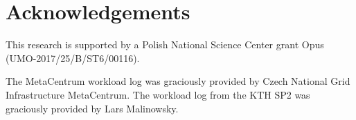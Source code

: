 \documentclass[runningheads]{llncs}
\begin{document}
\section*{Acknowledgements}
This research is supported by a Polish National Science Center grant Opus (UMO-2017/25/B/ST6/00116).

The MetaCentrum workload log \cite{10.1007/978-3-319-61756-5_5} was graciously provided by Czech National Grid Infrastructure MetaCentrum. The workload log from the KTH SP2 was graciously provided by Lars Malinowsky.
%
%
%


\end{document}
